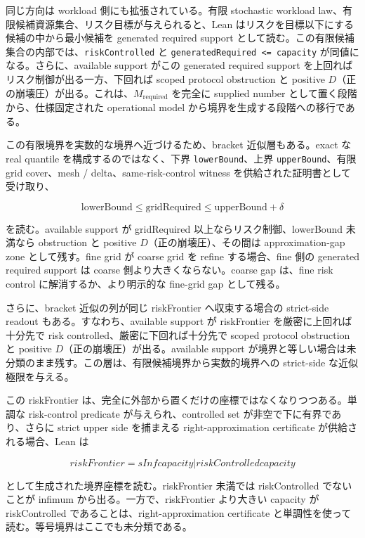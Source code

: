 \documentclass[12pt,a4paper]{article}
\begin{document}
同じ方向は workload 側にも拡張されている。有限 stochastic workload law、有限候補資源集合、リスク目標が与えられると、Lean はリスクを目標以下にする候補の中から最小候補を generated required support として読む。この有限候補集合の内部では、\texttt{riskControlled} と \texttt{generatedRequired\ \textless{}=\ capacity} が同値になる。さらに、available support がこの generated required support を上回ればリスク制御が出る一方、下回れば scoped protocol obstruction と positive \(D\)（正の崩壊圧）が出る。これは、\(M_{\mathrm{required}}\) を完全に supplied number として置く段階から、仕様固定された operational model から境界を生成する段階への移行である。

この有限境界を実数的な境界へ近づけるため、bracket 近似層もある。exact な real quantile を構成するのではなく、下界 \texttt{lowerBound}、上界 \texttt{upperBound}、有限 grid cover、mesh / delta、same-risk-control witness を供給された証明書として受け取り、

\[
\mathrm{lowerBound}
\le
\mathrm{gridRequired}
\le
\mathrm{upperBound}+\delta
\]

を読む。available support が gridRequired 以上ならリスク制御、lowerBound 未満なら obstruction と positive \(D\)（正の崩壊圧）、その間は approximation-gap zone として残す。fine grid が coarse grid を refine する場合、fine 側の generated required support は coarse 側より大きくならない。coarse gap は、fine risk control に解消するか、より明示的な fine-grid gap として残る。

さらに、bracket 近似の列が同じ riskFrontier へ収束する場合の strict-side readout もある。すなわち、available support が riskFrontier を厳密に上回れば十分先で risk controlled、厳密に下回れば十分先で scoped protocol obstruction と positive \(D\)（正の崩壊圧）が出る。available support が境界と等しい場合は未分類のまま残す。この層は、有限候補境界から実数的境界への strict-side な近似極限を与える。

この riskFrontier は、完全に外部から置くだけの座標ではなくなりつつある。単調な risk-control predicate が与えられ、controlled set が非空で下に有界であり、さらに strict upper side を捕まえる right-approximation certificate が供給される場合、Lean は

\[
riskFrontier = sInf {capacity | riskControlled capacity}
\]

として生成された境界座標を読む。riskFrontier 未満では riskControlled でないことが infimum から出る。一方で、riskFrontier より大きい capacity が riskControlled であることは、right-approximation certificate と単調性を使って読む。等号境界はここでも未分類である。
\end{document}
